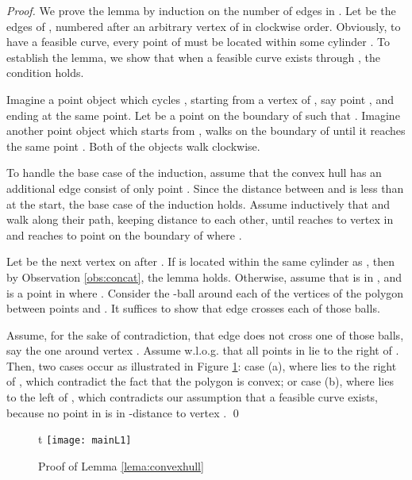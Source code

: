 \documentclass[a4paper,UKenglish]{lipics}
\begin{document}
\begin{proof}
We prove the lemma by induction on the number of 
edges in . 
Let   be the edges of , numbered 
after an arbitrary vertex of  in clockwise order. 
Obviously, to have a feasible curve, 
every point of  must be located within some cylinder .
To establish the lemma, we show that when a feasible curve
exists through , the condition holds. 

Imagine a point object
 which cycles , 
starting from a vertex of 
, say point , and ending at the same point.
Let  be a point on the boundary of  such that 
.
Imagine another point object   
which starts from , 
walks on the boundary of  until it reaches the same point .
Both of the objects walk clockwise. 

To handle the base case of the induction, assume that 
the convex hull has an additional edge consist 
of only  point . Since the distance between
 and  is less 
than  at the start,
the base case of the induction holds. 
Assume inductively that   and 
walk along their path, keeping distance 
to each other, until 
  reaches to vertex  in 
and  reaches to point  on the boundary of 
where .

Let  be the next  vertex  on 
after . If  is located within the same 
cylinder  as , 
then by Observation \ref{obs:concat}, the lemma holds. 
Otherwise, assume that 
 is in ,  and 
 is a point in  where . 
Consider the -ball around each of the vertices of 
the polygon between points  and . 
It suffices to show that edge  crosses 
each of those balls.


Assume, for the sake of contradiction, that edge  
does not cross one of those balls, say the one around 
vertex . 
Assume w.l.o.g. that all points 
in  lie to the right of .
Then, two cases occur as illustrated in Figure \ref{fig:convexHull}: 
case (a), where  lies to the right of , which contradict 
the fact that the polygon is convex;
or case (b), where  lies to the left of , which contradicts 
our assumption that a feasible curve exists, 
because
no point in  is in -distance to vertex .
\qed
\end{proof}



\begin{figure}{t}
	\centering
	\texttt{[image: mainL1]}
	\caption{Proof of Lemma \ref{lema:convexhull}}
	\label{fig:convexHull}
\end{figure}
\end{document}
